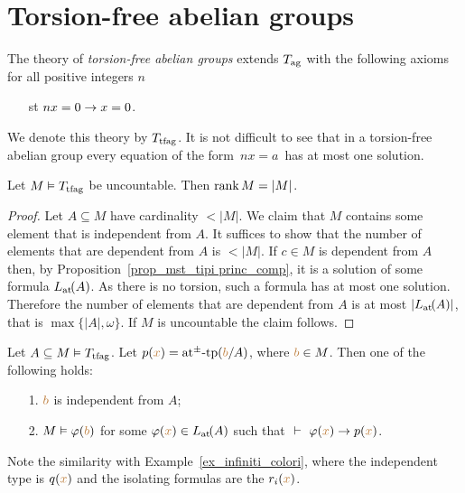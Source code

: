 \documentclass[creche.tex]{subfiles}
\begin{document}
\section{Torsion-free abelian groups}

The theory of \emph{torsion-free abelian groups\/} extends $T_{\rm ag}$ with the following axioms for all positive integers $n$
\begin{itemize}
\item[st] $nx= 0\imp x=0$.
\end{itemize}
We denote this theory by \emph{$T_{\rm tfag}$}. It is not difficult to see that in a torsion-free abelian group every equation of the form $\,nx = a\,$ has at most one solution.


\begin{proposition}
Let $M\models T_{\rm tfag}$ be uncountable. Then $\rank M=|M|$. 
\end{proposition}

\begin{proof}
Let $A\subseteq M$ have cardinality $<|M|$. We claim that $M$ contains some element that is independent from $A$. It suffices to show that the number of elements that are dependent from $A$ is $<|M|$. If $c\in M$ is dependent from $A$ then, by Proposition~\ref{prop_mst_tipi princ_comp}, it is a solution of some formula $\atL(A)$. As there is no torsion, such a formula has at most one solution. Therefore the number of elements that are dependent from $A$ is at most $|\atL(A)|$, that is $\max\big\{|A|,\omega\big\}$. If $M$ is uncountable the claim follows.
\end{proof}

\begin{proposition}\label{prop_mst_tipi princ_comp}
Let $A\subseteq M\models T_{\rm tfag}$.  Let $p({\mr x})=\atpmtp({\mr b}/A)$, where ${\mr b} \in M$. Then one of the following holds:   
\begin{itemize}
\item[1.] ${\mr b}$ is independent from $A$;
\item[2.] $M\models\phi({\mr b})$ for some $\phi({\mr x})\in\atL(A)$ such that $\ \proves\ \phi({\mr x})\imp p({\mr x})$.
\end{itemize}\end{proposition}

Note the similarity with Example~\ref{ex_infiniti_colori}, where the independent type is $q({\mr x})$ and the isolating formulas are the $r_i({\mr x})$. 
\end{document}
